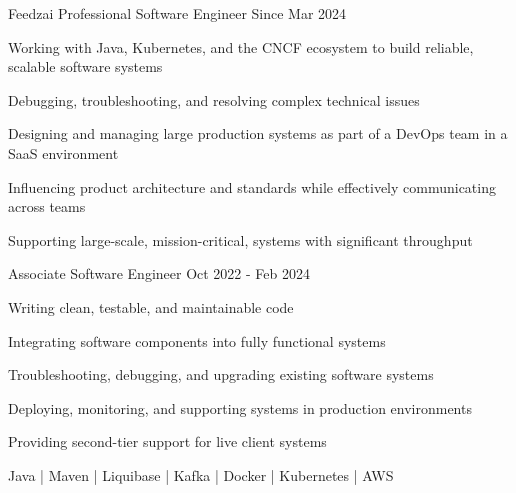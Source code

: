 


\begin{cventries}



\cventry
  {Feedzai}
  {Professional Software Engineer}
  {}
  {Since Mar 2024}
  {
    \begin{cvitems}
      \item{Working with Java, Kubernetes, and the CNCF ecosystem to build reliable, scalable software systems}
      \item{Debugging, troubleshooting, and resolving complex technical issues}
      \item{Designing and managing large production systems as part of a DevOps team in a SaaS environment}
      \item{Influencing product architecture and standards while effectively communicating across teams}
      \item{Supporting large-scale, mission-critical, systems with significant throughput}
    \end{cvitems}
  }
  {}

\cventry
  {}
  {Associate Software Engineer}
  {}
  {Oct 2022 - Feb 2024}
  {
    \begin{cvitems}
      \item{Writing clean, testable, and maintainable code}
      \item{Integrating software components into fully functional systems}
      \item{Troubleshooting, debugging, and upgrading existing software systems}
      \item{Deploying, monitoring, and supporting systems in production environments}
      \item{Providing second-tier support for live client systems}
    \end{cvitems}
  }
  {Java | Maven | Liquibase | Kafka | Docker | Kubernetes | AWS}


\end{cventries}

